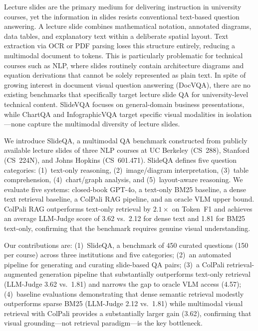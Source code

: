 \documentclass{article} %
\begin{document}
Lecture slides are the primary medium for delivering instruction in university courses, yet the information in slides resists conventional text-based question answering. A lecture slide combines mathematical notation, annotated diagrams, data tables, and explanatory text within a deliberate spatial layout. Text extraction via OCR or PDF parsing loses this structure entirely, reducing a multimodal document to tokens. This is particularly problematic for technical courses such as NLP, where slides routinely contain architecture diagrams and equation derivations that cannot be solely represented as plain text. In spite of growing interest in document visual question answering (DocVQA), there are no existing benchmarks that specifically target lecture slide QA for university-level technical content. SlideVQA \citep{tanaka2023slidevqa} focuses on general-domain business presentations, while ChartQA \citep{masry2022chartqa} and InfographicVQA \citep{mathew2021infographicvqa} target specific visual modalities in isolation---none capture the multimodal diversity of lecture slides.

We introduce SlideQA, a multimodal QA benchmark constructed from publicly available lecture slides of three NLP courses at UC Berkeley (CS~288), Stanford (CS~224N), and Johns Hopkins (CS~601.471). SlideQA defines five question categories: (1)~text-only reasoning, (2)~image/diagram interpretation, (3)~table comprehension, (4)~chart/graph analysis, and (5)~layout-aware reasoning. We evaluate five systems: closed-book GPT-4o, a text-only BM25 baseline, a dense text retrieval baseline, a ColPali RAG pipeline, and an oracle VLM upper bound. ColPali RAG outperforms text-only retrieval by $2.1\times$ on Token~F1 and achieves an average LLM-Judge score of 3.62 vs.\ 2.12 for dense text and 1.81 for BM25 text-only, confirming that the benchmark requires genuine visual understanding.

Our contributions are: (1)~SlideQA, a benchmark of 450 curated questions (150 per course) across three institutions and five categories; (2)~an automated pipeline for generating and curating slide-based QA pairs; (3)~a ColPali retrieval-augmented generation pipeline that substantially outperforms text-only retrieval (LLM-Judge 3.62 vs.\ 1.81) and narrows the gap to oracle VLM access (4.57); (4)~baseline evaluations demonstrating that dense semantic retrieval modestly outperforms sparse BM25 (LLM-Judge 2.12 vs.\ 1.81) while multimodal visual retrieval with ColPali provides a substantially larger gain (3.62), confirming that visual grounding---not retrieval paradigm---is the key bottleneck.
\end{document}
